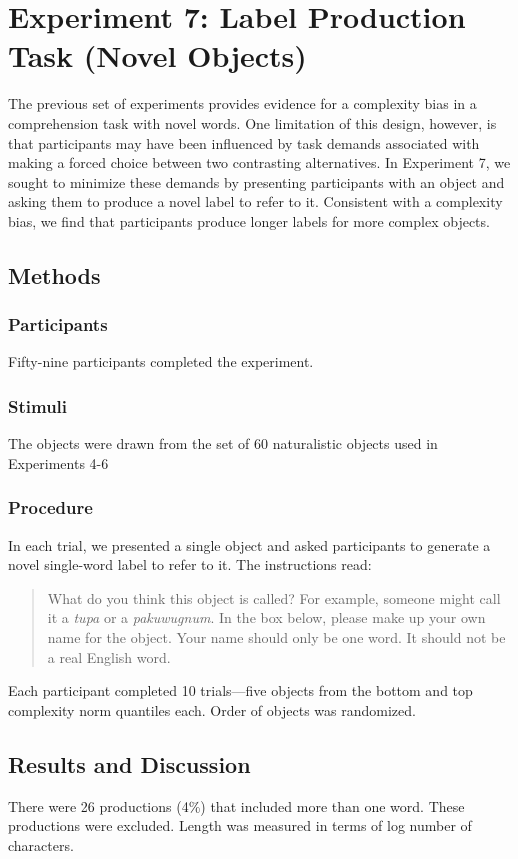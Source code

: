 \documentclass[man]{apa2}
\begin{document}
\section{Experiment 7: Label Production Task (Novel Objects)}

The previous set of experiments provides evidence for a complexity bias in a comprehension task with novel words. One limitation of this design, however, is that participants may have been influenced by task demands associated with making a forced choice between two contrasting alternatives. In Experiment 7, we sought to minimize these demands by presenting participants with an object and asking them to produce a novel label to refer to it. Consistent with a complexity bias, we find that participants produce longer labels for more complex objects.

\subsection{Methods}
\subsubsection{Participants} Fifty-nine participants completed the experiment.
\subsubsection{Stimuli} The objects were drawn from the set of 60 naturalistic objects used in Experiments 4-6
\subsubsection{Procedure}
In each trial, we presented a single object and asked participants to generate a novel single-word label to refer to it. The instructions read:

\begin{quote}
What do you think this object is called? For example, someone might call it a {\it tupa} or a {\it pakuwugnum}. In the box below, please make up your own name for the object. Your name should only be one word. It should not be a real English word.
\end{quote}
Each participant completed 10 trials---five objects from the bottom and top complexity norm quantiles each. Order of objects was randomized.

\subsection{Results and Discussion}
There were 26 productions (4\%) that included more than one word. These productions were excluded. Length was measured in terms of log number of characters.
\end{document}
